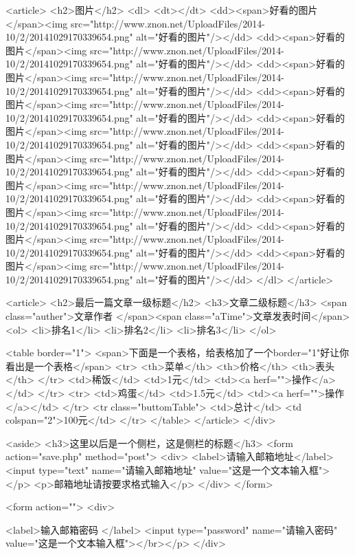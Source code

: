 <article>
<h2>图片</h2>
<dl>
   <dt></dt>
   <dd><span>好看的图片</span><img src="http://www.znon.net/UploadFiles/2014-10/2/20141029170339654.png"  alt="好看的图片"/></dd>
   <dd><span>好看的图片</span><img src="http://www.znon.net/UploadFiles/2014-10/2/20141029170339654.png"  alt="好看的图片"/></dd>
   <dd><span>好看的图片</span><img src="http://www.znon.net/UploadFiles/2014-10/2/20141029170339654.png"  alt="好看的图片"/></dd>
   <dd><span>好看的图片</span><img src="http://www.znon.net/UploadFiles/2014-10/2/20141029170339654.png"  alt="好看的图片"/></dd>
   <dd><span>好看的图片</span><img src="http://www.znon.net/UploadFiles/2014-10/2/20141029170339654.png"  alt="好看的图片"/></dd>
   <dd><span>好看的图片</span><img src="http://www.znon.net/UploadFiles/2014-10/2/20141029170339654.png"  alt="好看的图片"/></dd>
   <dd><span>好看的图片</span><img src="http://www.znon.net/UploadFiles/2014-10/2/20141029170339654.png"  alt="好看的图片"/></dd>
   <dd><span>好看的图片</span><img src="http://www.znon.net/UploadFiles/2014-10/2/20141029170339654.png"  alt="好看的图片"/></dd>
   <dd><span>好看的图片</span><img src="http://www.znon.net/UploadFiles/2014-10/2/20141029170339654.png"  alt="好看的图片"/></dd>
   <dd><span>好看的图片</span><img src="http://www.znon.net/UploadFiles/2014-10/2/20141029170339654.png"  alt="好看的图片"/></dd>
</dl>
</article>


<article>
<h2>最后一篇文章一级标题</h2>
<h3>文章二级标题</h3>
<span class="auther">文章作者 </span><span class="aTime">文章发表时间</span>
<ol>
	<li>排名1</li>
	<li>排名2</li>
	<li>排名3</li>
</ol>



<table border="1">
<span>下面是一个表格，给表格加了一个border="1"好让你看出是一个表格</span>
<tr>
<th>菜单</th>
<th>价格</th>
<th>表头</th>
</tr>
    <td>稀饭</td>
    <td>1元</td>
    <td><a herf="">操作</a></td>
</tr>
<tr>
    <td>鸡蛋</td>
    <td>1.5元</td>
    <td><a herf="">操作</a></td>
</tr>
<tr class="buttomTable">
     <td>总计</td>
     <td colspan="2">100元</td>
</tr>
</table>
</article>
</div>



<aside>
<h3>这里以后是一个侧栏，这是侧栏的标题</h3>
<form action="save.php" method="post">
     <div>
     <label>请输入邮箱地址</label>
     <input type="text" name="请输入邮箱地址" value="这是一个文本输入框"></p>
	 <p>邮箱地址请按要求格式输入</p>
	 </div>
</form>
 
<form action="">
  <div> 
   
   <label>输入邮箱密码  </label>
   <input type="password" name="请输入密码"  value="这是一个文本输入框"></br></p>
  </div>  

